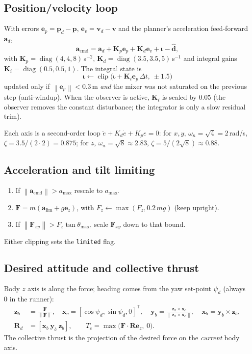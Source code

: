 \documentclass[11pt,a4paper]{article}
\newcommand{\vc}[1]{\bm{#1}}
\newcommand{\ez}{\vc{e}_z}
\newcommand{\norm}[1]{\left\lVert #1\right\rVert}
\newcommand{\code}[1]{\texttt{\small #1}}
\newcommand{\hatv}[1]{\widehat{#1}}
\DeclareMathOperator{\clip}{clip}
\DeclareMathOperator{\diag}{diag}
\begin{document}
\subsection{Position/velocity loop}
With errors $\vc e_p=\vc p_d-\vc p$, $\vc e_v=\vc v_d-\vc v$ and the planner's acceleration feed-forward $\vc a_d$,
\begin{equation}
\vc a_{\text{cmd}}=\vc a_d+\vc K_p\vc e_p+\vc K_d\vc e_v+\vc\iota-\hatv{\vc d},
\end{equation}
with $\vc K_p=\diag(4,4,8)$\,s$^{-2}$, $\vc K_d=\diag(3.5,3.5,5)$\,s$^{-1}$ and integral gains $\vc K_i=\diag(0.5,0.5,1)$. The integral state is
\begin{equation}
\vc\iota\leftarrow\clip\bigl(\vc\iota+\vc K_i\vc e_p\,\Delta t,\ \pm1.5\bigr)
\end{equation}
updated only if $\norm{\vc e_p}<0.3$\,m \emph{and} the mixer was not saturated on the previous step (anti-windup). When the observer is active, $\vc K_i$ is scaled by $0.05$ (the observer removes the constant disturbance; the integrator is only a slow residual trim).

Each axis is a second-order loop $\ddot e+K_d\dot e+K_pe=0$: for $x,y$, $\omega_n=\sqrt{4}=2$\,rad/s, $\zeta=3.5/(2\cdot2)=0.875$; for $z$, $\omega_n=\sqrt8\approx2.83$, $\zeta=5/(2\sqrt8)\approx0.88$.

\subsection{Acceleration and tilt limiting}
\begin{enumerate}
\item If $\norm{\vc a_{\text{cmd}}}>a_{\max}$ rescale to $a_{\max}$.
\item $\vc F=m(\vc a_{\text{lim}}+g\ez)$, with $F_z\leftarrow\max(F_z,0.2\,mg)$ (keep upright).
\item If $\norm{\vc F_{xy}}>F_z\tan\theta_{\max}$, scale $\vc F_{xy}$ down to that bound.
\end{enumerate}
Either clipping sets the \code{limited} flag.

\subsection{Desired attitude and collective thrust}
Body $z$ axis is along the force; heading comes from the yaw set-point $\psi_d$ (always $0$ in the runner):
\begin{align}
\vc z_b&=\frac{\vc F}{\norm{\vc F}},\quad \vc x_c=[\cos\psi_d,\sin\psi_d,0]^\top,\quad
\vc y_b=\frac{\vc z_b\times\vc x_c}{\norm{\vc z_b\times\vc x_c}},\quad \vc x_b=\vc y_b\times\vc z_b,\\
\vc R_d&=[\vc x_b\ \vc y_b\ \vc z_b],\qquad T_c=\max\bigl(\vc F\!\cdot\!\vc R\ez,\ 0\bigr).
\end{align}
The collective thrust is the projection of the desired force on the \emph{current} body axis.
\end{document}
